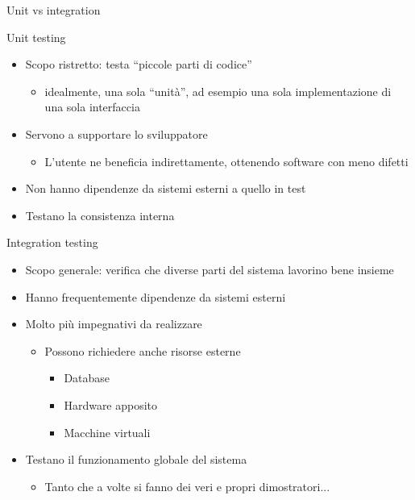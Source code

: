 \documentclass[presentation]{beamer}
\begin{document}
\begin{frame}[allowframebreaks]{Unit vs integration}
	\begin{block}{Unit testing}
		\begin{itemize}
			\item Scopo ristretto: testa ``piccole parti di codice''
			\begin{itemize}
				\item idealmente, una sola ``unità'', ad esempio una sola implementazione di una sola interfaccia
			\end{itemize}
			\item Servono a supportare lo sviluppatore
			\begin{itemize}
				\item L'utente ne beneficia indirettamente, ottenendo software con meno difetti
			\end{itemize}
			\item Non hanno dipendenze da sistemi esterni a quello in test
			\item Testano la consistenza interna
		\end{itemize}
	\end{block}
	\begin{block}{Integration testing}
		\begin{itemize}
			\item Scopo generale: verifica che diverse parti del sistema lavorino bene insieme
			\item Hanno frequentemente dipendenze da sistemi esterni
			\item Molto più impegnativi da realizzare
			\begin{itemize}
				\item Possono richiedere anche risorse esterne
				\begin{itemize}
					\item Database
					\item Hardware apposito
					\item Macchine virtuali
				\end{itemize}
			\end{itemize}
			\item Testano il funzionamento globale del sistema
			\begin{itemize}
				\item Tanto che a volte si fanno dei veri e propri dimostratori...
			\end{itemize}
		\end{itemize}
	\end{block}
\end{frame}
\end{document}

